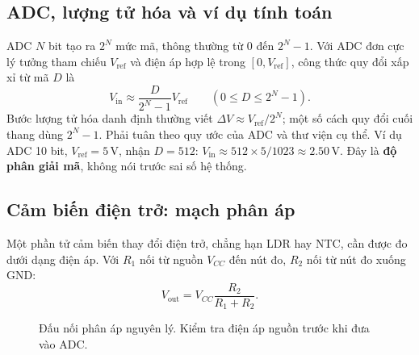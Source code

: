 \subsection{ADC, lượng tử hóa và ví dụ tính toán}
ADC $N$ bit tạo ra $2^N$ mức mã, thông thường từ $0$ đến $2^N-1$. Với ADC đơn cực lý tưởng tham chiếu $V_{\mathrm{ref}}$ và điện áp hợp lệ trong $[0,V_{\mathrm{ref}}]$, công thức quy đổi xấp xỉ từ mã $D$ là
\begin{equation}\boxed{V_{\mathrm{in}}\approx\frac{D}{2^N-1}V_{\mathrm{ref}}}\qquad (0\le D\le 2^N-1).\end{equation}
Bước lượng tử hóa danh định thường viết $\Delta V\approx V_{\mathrm{ref}}/2^N$; một số cách quy đổi cuối thang dùng $2^N-1$. Phải tuân theo quy ước của ADC và thư viện cụ thể. Ví dụ ADC 10 bit, $V_{\mathrm{ref}}=5\,\mathrm{V}$, nhận $D=512$: $V_{\mathrm{in}}\approx512\times5/1023\approx2.50\,\mathrm{V}$. Đây là \textbf{độ phân giải mã}, không nói trước sai số hệ thống.

\subsection{Cảm biến điện trở: mạch phân áp}
Một phần tử cảm biến thay đổi điện trở, chẳng hạn LDR hay NTC, cần được đo dưới dạng điện áp. Với $R_1$ nối từ nguồn $V_{CC}$ đến nút đo, $R_2$ nối từ nút đo xuống GND:
\begin{equation}V_{\mathrm{out}}=V_{CC}\frac{R_2}{R_1+R_2}.\end{equation}
\begin{figure}[htbp]\centering
{}
\caption{Đấu nối phân áp nguyên lý. Kiểm tra điện áp nguồn trước khi đưa vào ADC.}
\end{figure}

